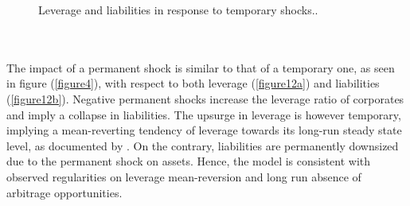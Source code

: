 \documentclass[11pt]{article}
\begin{document}
\begin{figure}[h!]
\centering
{}\quad
{}
 \caption{Leverage and liabilities in response to temporary shocks..} \label{figure12}
\end{figure}\\\\
The impact of a permanent shock is similar to that of a temporary one, as seen in figure (\ref{figure4}), with respect to both leverage (\ref{figure12a}) and liabilities (\ref{figure12b}). Negative permanent shocks increase the leverage ratio of corporates and imply a collapse in liabilities. The upsurge in leverage is however temporary, implying a mean-reverting tendency of leverage towards its long-run steady state level, as documented by \cite{15}. On the contrary, liabilities are permanently downsized due to the permanent shock on assets. Hence, the model is consistent with observed regularities on leverage mean-reversion and long run absence of arbitrage opportunities.
\end{document}
